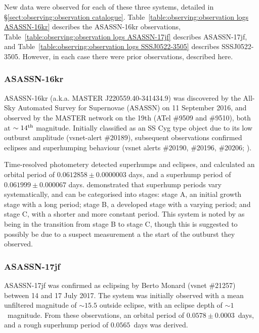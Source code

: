 New data were observed for each of these three systems, detailed in \S\ref{sect:observing:observation catalogue}. Table~\ref{table:observing:observation logs ASASSN-16kr} describes the ASASSN-16kr observations, Table~\ref{table:observing:observation logs ASASSN-17jf} describes ASASSN-17jf, and Table~\ref{table:observing:observation logs SSSJ0522-3505} describes SSSJ0522-3505. However, in each case there were prior observations, described here.


\subsubsection{ASASSN-16kr}
\label{sect:three white dwarfs:ASASSN-16kr prior observations}
ASASSN-16kr (a.k.a. MASTER J220559.40-341434.9) was discovered by the All-Sky Automated Survey for Supernovae (ASASSN) on 11 September 2016, and observed by the MASTER network on the 19th (ATel \#9509 and \#9510), both at $\sim 14^{\rm th}$ magnitude.
Initially classified as an SS Cyg type object due to its low outburst amplitude (vsnet-alert \#20189), subsequent observations confirmed eclipses and superhumping behaviour (vsnet alerts \#20190, \#20196, \#20206; \citealt{kato2017}).

Time-resolved photometery detected superhumps and eclipses, and \citet{kato2017} calculated an orbital period of $0.0612858\pm0.0000003$ days, and a superhump period of $0.061999\pm0.000067$ days. \citet{Kato2009a} demonstrated that superhump periods vary systematically, and can be categorised into stages: stage A, an initial growth stage with a long period; stage B, a developed stage with a varying period; and stage C, with a shorter and more constant period. This system is noted by \citet{kato2017} as being in the transition from stage B to stage C, though this is suggested to possibly be due to a suspect measurement a the start of the outburst they observed.


\subsubsection{ASASSN-17jf}
\label{sect:three white dwarfs:ASASSN-17jf prior observations}
ASASSN-17jf was confirmed as eclipsing by Berto Monard (vsnet \#21257) between 14 and 17 July 2017. The system was initially observed with a mean unfiltered magnitude of $\sim15.5$ outside eclipse, with an eclipse depth of $\sim1$\ magnitude. From these observations, an orbital period of $0.0578\pm 0.0003$\ days, and a rough superhump period of $0.0565$\ days was derived.


